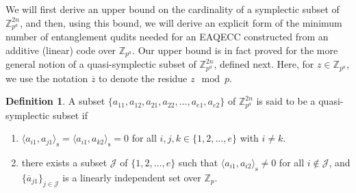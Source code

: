 \documentclass{article}
\theoremstyle{remark}
\theoremstyle{definition}
\newtheorem{defin}{Definition}[section]
\numberwithin{equation}{section}
\begin{document}
We will first derive an upper bound on the cardinality of a symplectic subset of $\mathbb{Z}_{p^a}^{2n}$, and then, using this bound, we will derive an explicit form of the minimum number of entanglement qudits needed for an EAQECC constructed from an additive (linear) code over $\mathbb{Z}_{p^a}.$   Our upper bound is in fact proved for the more general notion of a quasi-symplectic subset of ${\mathbb{Z}^{2n}_{p^a}}$, defined next. Here, for $z \in \mathbb{Z}_{p^a}$, we use the notation $\overline{z}$ to denote the residue $z \!\! \mod p$. 
\begin{defin} A subset $\{a_{11},a_{12},a_{21},a_{22},\ldots,a_{e1},a_{e2}\}$
 of ${\mathbb{Z}^{2n}_{p^a}}$ is said to be a quasi-symplectic subset if
 \begin{enumerate}
 \item[(a)] $\langle a_{i1}, a_{j1} \rangle_{\text{s}}=\langle a_{i1}, a_{k 2} \rangle_{\text{s}}=0$ for all $i ,j, k  \in \{1,2,\ldots,e\}$ with $i \neq k.$
 \item[(b)] there exists a subset $\mathcal{J}$ of $\{1,2,\ldots,e \}$ such that $\langle a_{i1}, a_{i2} \rangle_{\text{s}}\neq0$ for all $i \not\in \mathcal{J}$, and $\{\overline{a}_{j1} \}_{j \in \mathcal{J}}$ is a linearly independent set over $\mathbb{Z}_p.$
 \end{enumerate}
\end{defin}
\end{document}
